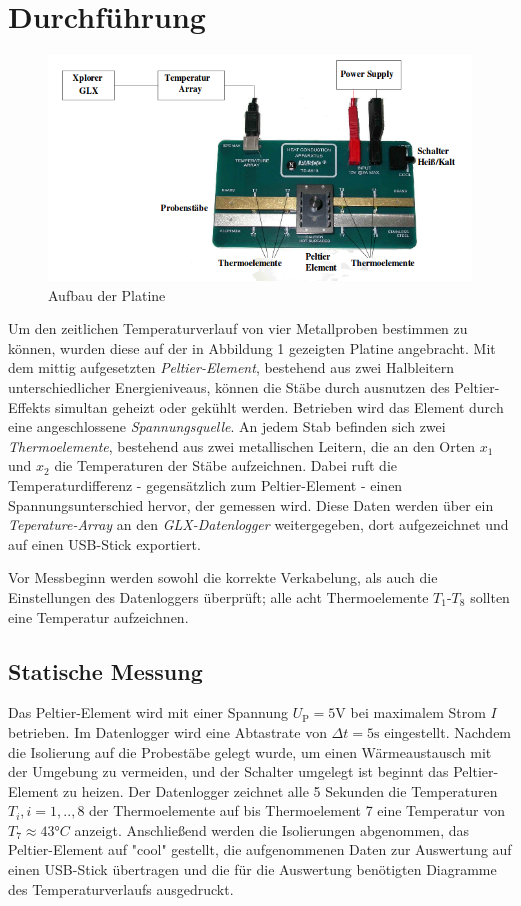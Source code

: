 \newpage
\section{Durchführung}
\label{sec:Durchfuehrung}
\begin{figure}
	\label{fig:platine}
	\centering
	\includegraphics[width=\textwidth]{Bilder/Aufbau.png}
	\caption{Aufbau der Platine}
\end{figure}

Um den zeitlichen Temperaturverlauf von vier Metallproben bestimmen zu können, wurden diese auf der in Abbildung 1 gezeigten Platine angebracht. Mit dem mittig aufgesetzten \emph{Peltier-Element}, bestehend aus zwei Halbleitern unterschiedlicher Energieniveaus, können die Stäbe durch ausnutzen des Peltier-Effekts simultan geheizt oder gekühlt werden. Betrieben wird das Element durch eine angeschlossene \emph{Spannungsquelle}. 
An jedem Stab befinden sich zwei \emph{Thermoelemente}, bestehend aus zwei metallischen Leitern, die an den Orten $x_1$ und $x_2$ die Temperaturen der Stäbe aufzeichnen. Dabei ruft die Temperaturdifferenz - gegensätzlich zum Peltier-Element - einen Spannungsunterschied hervor, der gemessen wird. Diese Daten werden über ein \emph{Teperature-Array} an den \emph{GLX-Datenlogger} weitergegeben, dort aufgezeichnet und auf einen USB-Stick exportiert. 

Vor Messbeginn werden sowohl die korrekte Verkabelung, als auch die Einstellungen des Datenloggers überprüft; alle acht Thermoelemente $T_\mathup{1}$-$T_\mathup{8}$ sollten eine Temperatur aufzeichnen.

\subsection{Statische Messung}

Das Peltier-Element wird mit einer Spannung $U_\mathup{P}=5 \si{\volt}$ bei maximalem Strom $I$ betrieben. Im Datenlogger wird eine Abtastrate von $\Delta{t}=5\si{\second}$ eingestellt. Nachdem die Isolierung auf die Probestäbe gelegt wurde, um einen Wärmeaustausch mit der Umgebung zu vermeiden, und der Schalter umgelegt ist beginnt das Peltier-Element zu heizen. Der Datenlogger zeichnet alle 5 Sekunden die Temperaturen $T_i, i=1,..,8$ der Thermoelemente auf bis Thermoelement 7 eine Temperatur von $T_\mathup{7}\approx 43°C$ anzeigt. Anschließend werden die Isolierungen abgenommen, das Peltier-Element auf "cool" gestellt, die aufgenommenen Daten zur Auswertung auf einen USB-Stick übertragen und die für die Auswertung benötigten Diagramme des Temperaturverlaufs ausgedruckt.

